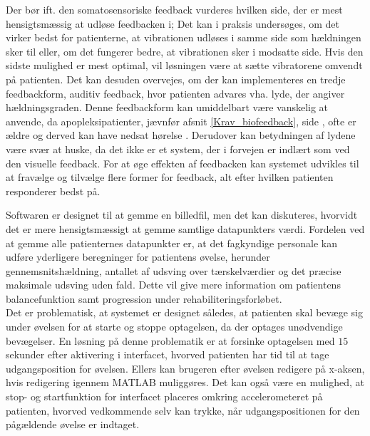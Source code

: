 Der bør ift. den somatosensoriske feedback vurderes hvilken side, der er mest hensigtsmæssig at udløse feedbacken i; Det kan i praksis undersøges, om det virker bedst for patienterne, at vibrationen udløses i samme side som hældningen sker til eller, om det fungerer bedre, at vibrationen sker i modsatte side. Hvis den sidste mulighed er mest optimal, vil løsningen være at sætte vibratorene omvendt på patienten. Det kan desuden overvejes, om der kan implementeres en tredje feedbackform, auditiv feedback, hvor patienten advares vha. lyde, der angiver hældningsgraden. Denne feedbackform kan umiddelbart være vanskelig at anvende, da apopleksipatienter, jævnfør afsnit \ref{Krav_biofeedback}, side \pageref{Krav_biofeedback}, ofte er ældre og derved kan have nedsat hørelse \cite{Sundhedsstyrelsen2011}. Derudover kan betydningen af lydene være svær at huske, da det ikke er et system, der i forvejen er indlært som ved den visuelle feedback. For at øge effekten af feedbacken kan systemet udvikles til at fravælge og tilvælge flere former for feedback, alt efter hvilken patienten responderer bedst på.

Softwaren er designet til at gemme en billedfil, men det kan diskuteres, hvorvidt det er mere hensigtsmæssigt at gemme samtlige datapunkters værdi. Fordelen ved at gemme alle patienternes datapunkter er, at det fagkyndige personale kan udføre yderligere beregninger for patientens øvelse, herunder gennemsnitshældning, antallet af udsving over tærskelværdier og det præcise maksimale udsving uden fald. Dette vil give mere information om patientens balancefunktion samt progression under rehabiliteringsforløbet. \\
Det er problematisk, at systemet er designet således, at patienten skal bevæge sig under øvelsen for at starte og stoppe optagelsen, da der optages unødvendige bevægelser. En løsning på denne problematik er at forsinke optagelsen med $15$ sekunder efter aktivering i interfacet, hvorved patienten har tid til at tage udgangsposition for øvelsen. Ellers kan brugeren efter øvelsen redigere på x-aksen, hvis redigering igennem MATLAB muliggøres. Det kan også være en mulighed, at stop- og startfunktion for interfacet placeres omkring accelerometeret på patienten, hvorved vedkommende selv kan trykke, når udgangspositionen for den pågældende øvelse er indtaget.

